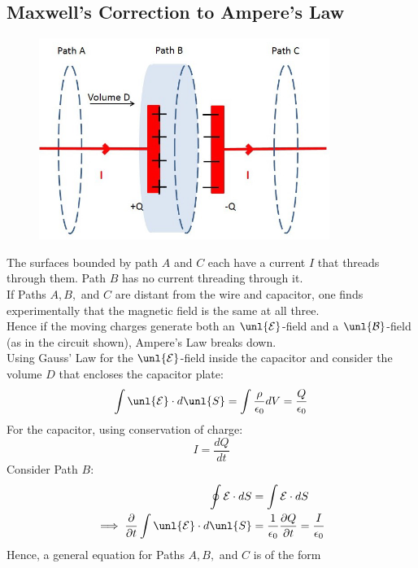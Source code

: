 \documentclass[a4paper, 11pt, normalem]{report}
\newcommand\p{\partial}
\newcommand\E{\mathcal{E}}
\newcommand\uE{\unl{\E}}
\newcommand\B{\mathcal{B}}
\newcommand\uB{\unl{\B}}
\newcommand\eno{\epsilon_0}
\begin{document}
\subsection{Maxwell's Correction to Ampere's Law}
\begin{figure}
    \begin{center}
        \vspace{-40pt}
        \includegraphics[scale=0.4]{cap4.png}
    \end{center}
\end{figure}
The surfaces bounded by path $A$ and $C$ each have a current $I$ that threads through them.
Path $B$ has no current threading through it. \\
If Paths $A,B,$ and $C$ are distant from the wire and capacitor, one finds experimentally that the magnetic field is the same at all three. \\
Hence if the moving charges generate both an $\uE$-field and a $\uB$-field (as in the circuit shown), Ampere's Law breaks down. \\
Using Gauss' Law for the $\uE$-field inside the capacitor and consider the volume $D$ that encloses the capacitor plate:
\begin{equation*}
    \int \uE \cdot d\unl{S} = \int \frac{\rho}{\eno}dV = \frac{Q}{\eno}
\end{equation*}
For the capacitor, using conservation of charge:
\begin{equation*}
    I = \frac{dQ}{dt}
\end{equation*}
Consider Path $B$:
\begin{align*}
    \oint \E \cdot dS &= \int \E \cdot dS \\
    \implies \frac{\p}{\p t} \int \uE \cdot d\unl{S} &= \frac{1}{\eno}\frac{\p Q}{\p t} = \frac{I}{\eno}
\end{align*}
Hence, a general equation for Paths $A,B,$ and $C$ is of the form
\end{document}
